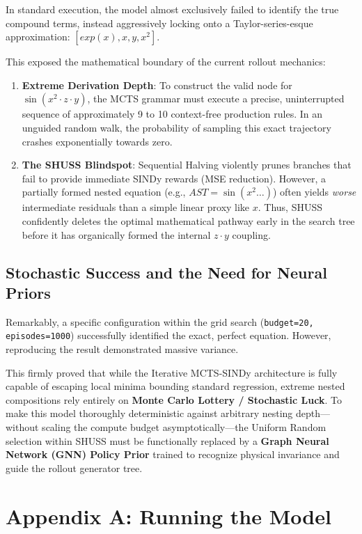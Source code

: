 \documentclass[11pt, a4paper]{article}
\begin{document}
In standard execution, the model almost exclusively failed to identify the true compound terms, instead aggressively locking onto a Taylor-series-esque approximation: $[exp(x), x, y, x^2]$. 

This exposed the mathematical boundary of the current rollout mechanics:
\begin{enumerate}
    \item \textbf{Extreme Derivation Depth}: To construct the valid node for $\sin(x^2 \cdot z \cdot y)$, the MCTS grammar must execute a precise, uninterrupted sequence of approximately 9 to 10 context-free production rules. In an unguided random walk, the probability of sampling this exact trajectory crashes exponentially towards zero.
    \item \textbf{The SHUSS Blindspot}: Sequential Halving violently prunes branches that fail to provide immediate SINDy rewards (MSE reduction). However, a partially formed nested equation (e.g., $AST = \sin(x^2 \dots)$) often yields \textit{worse} intermediate residuals than a simple linear proxy like $x$. Thus, SHUSS confidently deletes the optimal mathematical pathway early in the search tree before it has organically formed the internal $z \cdot y$ coupling.
\end{enumerate}

\subsection{Stochastic Success and the Need for Neural Priors}
Remarkably, a specific configuration within the grid search (\texttt{budget=20, episodes=1000}) successfully identified the exact, perfect equation. However, reproducing the result demonstrated massive variance.

This firmly proved that while the Iterative MCTS-SINDy architecture is fully capable of escaping local minima bounding standard regression, extreme nested compositions rely entirely on \textbf{Monte Carlo Lottery / Stochastic Luck}. To make this model thoroughly deterministic against arbitrary nesting depth—without scaling the compute budget asymptotically—the Uniform Random selection within SHUSS must be functionally replaced by a \textbf{Graph Neural Network (GNN) Policy Prior} trained to recognize physical invariance and guide the rollout generator tree.

\section*{Appendix A: Running the Model}
\end{document}
